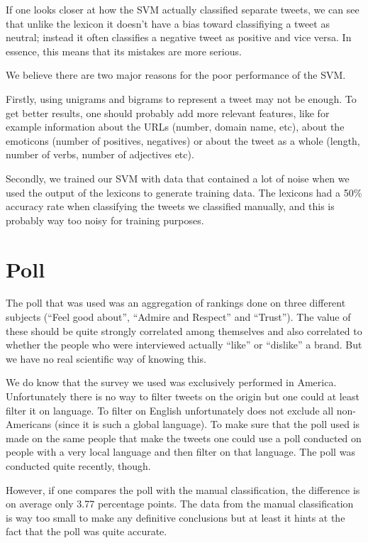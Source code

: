 \documentclass[a4paper,12pt]{report}
\begin{document}
If one looks closer at how the SVM actually classified separate tweets, we can see that unlike the lexicon it doesn't have a bias toward classifiying a tweet as neutral; instead it often classifies a negative tweet as positive and vice versa.
In essence, this means that its mistakes are more serious.

We believe there are two major reasons for the poor performance of the SVM.

Firstly, using unigrams and bigrams to represent a tweet may not be enough. To get better results, one should probably add more relevant features, like for example information about the URLs (number, domain name, etc), about the emoticons (number of positives, negatives) or about the tweet as a whole (length, number of verbs, number of adjectives etc).


Secondly, we trained our SVM with data that contained a lot of noise when we used the output of the lexicons to generate training data. The lexicons had a 50\% accuracy rate when classifying the tweets we classified manually, and this is probably way too noisy for training purposes.

\section{Poll}

The poll that was used was an aggregation of rankings done on three different subjects (“Feel good about”, “Admire and Respect” and “Trust”). The value of these should be quite strongly correlated among themselves and also correlated to whether the people who were interviewed actually “like” or “dislike” a brand. But we have no real scientific way of knowing this.

We do know that the survey we used was exclusively performed in America. Unfortunately there is no way to filter tweets on the origin but one could at least filter it on language. To filter on English unfortunately does not exclude all non-Americans (since it is such a global language). To make sure that the poll used is made on the same people that make the tweets one could use a poll conducted on people with a very local language and then filter on that language. The poll was conducted quite recently, though.

However, if one compares the poll with the manual classification, the difference is on average only 3.77 percentage points. The data from the manual classification is way too small to make any definitive conclusions but at least it hints at the fact that the poll was quite accurate.
\end{document}
